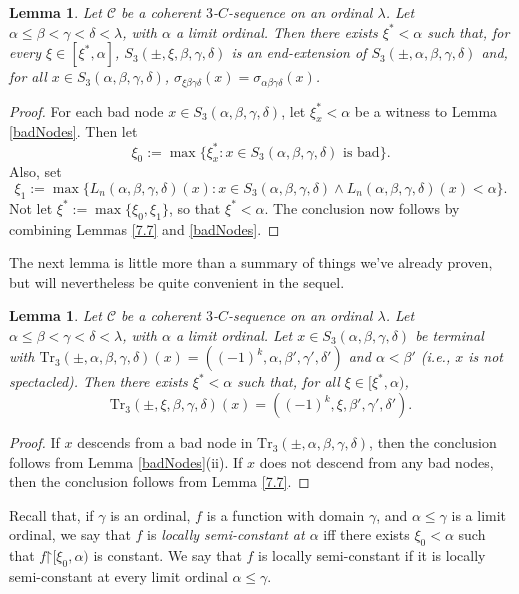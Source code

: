 \documentclass{amsart}
\numberwithin{theorem}{section}
\newtheorem{lemma}[theorem]{Lemma}
\theoremstyle{definition}
\newcommand{\restr}{\mathord{\upharpoonright}}
\newcommand{\C}{\mathcal{C}}
\newcommand{\Tr}{\mathrm{Tr}}
\begin{document}
\begin{lemma}\label{end_ext}
Let $\C$ be a coherent $3$-$C$-sequence on an ordinal $\lambda$. Let $\alpha\leq\beta<\gamma<\delta<\lambda$, with $\alpha$ a limit ordinal. Then there exists $\xi^*<\alpha$ such that, for every $\xi\in [\xi^*,\alpha]$, $S_3(\pm,\xi,\beta,\gamma,\delta)$ is an end-extension of $S_3(\pm,\alpha,\beta,\gamma,\delta)$ and, for all $x \in S_3(\alpha,\beta,\gamma,\delta)$, 
$\sigma_{\xi\beta\gamma\delta}(x) = \sigma_{\alpha\beta\gamma\delta}(x)$.
\end{lemma}

\begin{proof}
For each bad node $x\in S_3(\alpha,\beta,\gamma,\delta)$, let $\xi^*_x<\alpha$ be a witness to Lemma \ref{badNodes}. Then let
\[
\xi_0:=\max\{\xi_x^*:x\in S_3(\alpha,\beta,\gamma,\delta)\text{ is bad}\}.
\]
Also, set
\[
\xi_1:=\max\{L_n(\alpha,\beta,\gamma,\delta)(x):x\in S_3(\alpha,\beta,\gamma,\delta) \wedge L_n(\alpha,\beta,\gamma,\delta)(x)<\alpha\}.
\]
Not let $\xi^*:=\max\{\xi_0,\xi_1\}$, so that $\xi^*<\alpha$. The conclusion now follows by combining Lemmas \ref{7.7} and \ref{badNodes}.
\end{proof}

The next lemma is little more than a summary of things we've already proven, but will nevertheless be quite convenient in the sequel.

\begin{lemma}\label{easyNodes}
Let $\C$ be a coherent $3$-$C$-sequence on an ordinal $\lambda$. Let $\alpha\leq\beta<\gamma<\delta<\lambda$, with $\alpha$ a limit ordinal. Let $x\in S_3(\alpha,\beta,\gamma,\delta)$ be terminal with $\Tr_3(\pm,\alpha,\beta,\gamma,\delta)(x)=((-1)^k,\alpha,\beta',\gamma',\delta')$ and $\alpha<\beta'$ (i.e., $x$ is not spectacled). Then there exists $\xi^*<\alpha$ such that, for all $\xi\in [\xi^*,\alpha)$,
\[
\Tr_3(\pm,\xi,\beta,\gamma,\delta)(x)=((-1)^k,\xi,\beta',\gamma',\delta').
\]
\end{lemma}

\begin{proof}
If $x$ descends from a bad node in $\Tr_3(\pm,\alpha,\beta,\gamma,\delta)$, then the conclusion follows from Lemma \ref{badNodes}(ii). If $x$ does not descend from any bad nodes, then the conclusion follows from Lemma \ref{7.7}.
\end{proof}


Recall that, if $\gamma$ is an ordinal, $f$ is a function with domain $\gamma$, and 
$\alpha \leq \gamma$ is a limit ordinal,  we say that $f$ is \emph{locally semi-constant at $\alpha$} 
iff there exists $\xi_0<\alpha$ such that $f\restr [\xi_0,\alpha)$ is constant. We say 
that $f$ is locally semi-constant if it is locally semi-constant at every limit ordinal
$\alpha \leq \gamma$.
\end{document}
